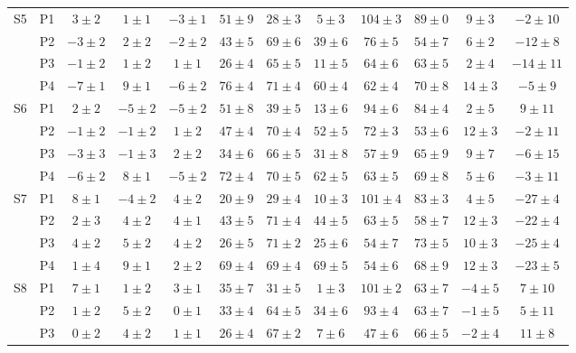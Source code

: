 \begin{table}[!ht]
{\begin{tabular}{|c|c||c|c|c|c|c|c|c|c|c|c|}
    \hline
    \hline
    \multirow{4}{*}{S5} & P1 & $3\pm 2$ & $1\pm 1$ & $-3\pm 1$ & $51\pm 9$ & $28\pm 3$ & $5\pm 3$ & $104\pm 3$ & $89\pm 0$ & $9\pm 3$ & $-2\pm 10$ \\
     & P2 & $-3\pm 2$ & $2\pm 2$ & $-2\pm 2$ & $43\pm 5$ & $69\pm 6$ & $39\pm 6$ & $76\pm 5$ & $54\pm 7$ & $6\pm 2$ & $-12\pm 8$ \\
     & P3 & $-1\pm 2$ & $1\pm 2$ & $1\pm 1$ & $26\pm 4$ & $65\pm 5$ & $11\pm 5$ & $64\pm 6$ & $63\pm 5$ & $2\pm 4$ & $-14\pm 11$ \\
     & P4 & $-7\pm 1$ & $9\pm 1$ & $-6\pm 2$ & $76\pm 4$ & $71\pm 4$ & $60\pm 4$ & $62\pm 4$ & $70\pm 8$ & $14\pm 3$ & $-5\pm 9$ \\
    \hline
    \hline
    \multirow{4}{*}{S6} & P1 & $2\pm 2$ & $-5\pm 2$ & $-5\pm 2$ & $51\pm 8$ & $39\pm 5$ & $13\pm 6$ & $94\pm 6$ & $84\pm 4$ & $2\pm 5$ & $9\pm 11$ \\
     & P2 & $-1\pm 2$ & $-1\pm 2$ & $1\pm 2$ & $47\pm 4$ & $70\pm 4$ & $52\pm 5$ & $72\pm 3$ & $53\pm 6$ & $12\pm 3$ & $-2\pm 11$ \\
     & P3 & $-3\pm 3$ & $-1\pm 3$ & $2\pm 2$ & $34\pm 6$ & $66\pm 5$ & $31\pm 8$ & $57\pm 9$ & $65\pm 9$ & $9\pm 7$ & $-6\pm 15$ \\
     & P4 & $-6\pm 2$ & $8\pm 1$ & $-5\pm 2$ & $72\pm 4$ & $70\pm 5$ & $62\pm 5$ & $63\pm 5$ & $69\pm 8$ & $5\pm 6$ & $-3\pm 11$ \\
    \hline
    \hline
    \multirow{4}{*}{S7} & P1 & $8\pm 1$ & $-4\pm 2$ & $4\pm 2$ & $20\pm 9$ & $29\pm 4$ & $10\pm 3$ & $101\pm 4$ & $83\pm 3$ & $4\pm 5$ & $-27\pm 4$ \\
     & P2 & $2\pm 3$ & $4\pm 2$ & $4\pm 1$ & $43\pm 5$ & $71\pm 4$ & $44\pm 5$ & $63\pm 5$ & $58\pm 7$ & $12\pm 3$ & $-22\pm 4$ \\
     & P3 & $4\pm 2$ & $5\pm 2$ & $4\pm 2$ & $26\pm 5$ & $71\pm 2$ & $25\pm 6$ & $54\pm 7$ & $73\pm 5$ & $10\pm 3$ & $-25\pm 4$ \\
     & P4 & $1\pm 4$ & $9\pm 1$ & $2\pm 2$ & $69\pm 4$ & $69\pm 4$ & $69\pm 5$ & $54\pm 6$ & $68\pm 9$ & $12\pm 3$ & $-23\pm 5$ \\
    \hline
    \hline
    \multirow{4}{*}{S8} & P1 & $7\pm 1$ & $1\pm 2$ & $3\pm 1$ & $35\pm 7$ & $31\pm 5$ & $1\pm 3$ & $101\pm 2$ & $63\pm 7$ & $-4\pm 5$ & $7\pm 10$ \\
     & P2 & $1\pm 2$ & $5\pm 2$ & $0\pm 1$ & $33\pm 4$ & $64\pm 5$ & $34\pm 6$ & $93\pm 4$ & $63\pm 7$ & $-1\pm 5$ & $5\pm 11$ \\
     & P3 & $0\pm 2$ & $4\pm 2$ & $1\pm 1$ & $26\pm 4$ & $67\pm 2$ & $7\pm 6$ & $47\pm 6$ & $66\pm 5$ & $-2\pm 4$ & $11\pm 8$ \\

\end{tabular}}
\end{table}
